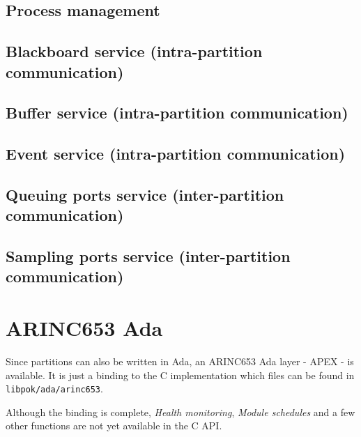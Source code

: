    \subsection{Process management}
   

   \subsection{Blackboard service (intra-partition communication)}
   

   \subsection{Buffer service (intra-partition communication)}
   

   \subsection{Event service (intra-partition communication)}
   

   \subsection{Queuing ports service (inter-partition communication)}
   

   \subsection{Sampling ports service (inter-partition communication)}
   


   \section{ARINC653 Ada}
   \label{api-libpok-arinc653-ada}

   Since partitions can also be written in Ada, an ARINC653 Ada layer - APEX -
   is available. It is just a binding to the C implementation which files can
   be found in \texttt{libpok/ada/arinc653}.

   Although the binding is complete, \emph{Health monitoring}, \emph{Module
     schedules} and a few other functions are not yet available in the C API.

